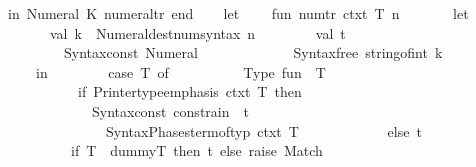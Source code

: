 \begin{isabellebody}
\ \ in\ {\isacharbrackleft}{\kern0pt}{\isacharparenleft}{\kern0pt}\isactrlsyntaxUNDERSCOREconst {\isasymopen}{\isacharunderscore}{\kern0pt}Numeral{\isasymclose}{\isacharcomma}{\kern0pt}\ K\ numeral{\isacharunderscore}{\kern0pt}tr{\isacharparenright}{\kern0pt}{\isacharbrackright}{\kern0pt}\ end\isanewline
{\isacartoucheclose}\isanewline
\isanewline
{}\isamarkupfalse%
\ {\isacartoucheopen}\isanewline
\ \ let\isanewline
\ \ \ \ fun\ num{\isacharunderscore}{\kern0pt}tr{\isacharprime}{\kern0pt}\ ctxt\ T\ {\isacharbrackleft}{\kern0pt}n{\isacharbrackright}{\kern0pt}\ {\isacharequal}{\kern0pt}\isanewline
\ \ \ \ \ \ let\isanewline
\ \ \ \ \ \ \ \ val\ k\ {\isacharequal}{\kern0pt}\ Numeral{\isachardot}{\kern0pt}dest{\isacharunderscore}{\kern0pt}num{\isacharunderscore}{\kern0pt}syntax\ n{\isacharsemicolon}{\kern0pt}\isanewline
\ \ \ \ \ \ \ \ val\ t{\isacharprime}{\kern0pt}\ {\isacharequal}{\kern0pt}\isanewline
\ \ \ \ \ \ \ \ \ \ Syntax{\isachardot}{\kern0pt}const\ \isactrlsyntaxUNDERSCOREconst {\isasymopen}{\isacharunderscore}{\kern0pt}Numeral{\isasymclose}\ {\isachardollar}{\kern0pt}\isanewline
\ \ \ \ \ \ \ \ \ \ \ \ Syntax{\isachardot}{\kern0pt}free\ {\isacharparenleft}{\kern0pt}string{\isacharunderscore}{\kern0pt}of{\isacharunderscore}{\kern0pt}int\ k{\isacharparenright}{\kern0pt}{\isacharsemicolon}{\kern0pt}\isanewline
\ \ \ \ \ \ in\isanewline
\ \ \ \ \ \ \ \ {\isacharparenleft}{\kern0pt}case\ T\ of\isanewline
\ \ \ \ \ \ \ \ \ \ Type\ {\isacharparenleft}{\kern0pt}\isactrltypeUNDERSCOREname {\isasymopen}fun{\isasymclose}{\isacharcomma}{\kern0pt}\ {\isacharbrackleft}{\kern0pt}{\isacharunderscore}{\kern0pt}{\isacharcomma}{\kern0pt}\ T{\isacharprime}{\kern0pt}{\isacharbrackright}{\kern0pt}{\isacharparenright}{\kern0pt}\ {\isacharequal}{\kern0pt}{\isachargreater}{\kern0pt}\isanewline
\ \ \ \ \ \ \ \ \ \ \ \ if\ Printer{\isachardot}{\kern0pt}type{\isacharunderscore}{\kern0pt}emphasis\ ctxt\ T{\isacharprime}{\kern0pt}\ then\isanewline
\ \ \ \ \ \ \ \ \ \ \ \ \ \ Syntax{\isachardot}{\kern0pt}const\ \isactrlsyntaxUNDERSCOREconst {\isasymopen}{\isacharunderscore}{\kern0pt}constrain{\isasymclose}\ {\isachardollar}{\kern0pt}\ t{\isacharprime}{\kern0pt}\ {\isachardollar}{\kern0pt}\isanewline
\ \ \ \ \ \ \ \ \ \ \ \ \ \ \ \ Syntax{\isacharunderscore}{\kern0pt}Phases{\isachardot}{\kern0pt}term{\isacharunderscore}{\kern0pt}of{\isacharunderscore}{\kern0pt}typ\ ctxt\ T{\isacharprime}{\kern0pt}\isanewline
\ \ \ \ \ \ \ \ \ \ \ \ else\ t{\isacharprime}{\kern0pt}\isanewline
\ \ \ \ \ \ \ \ {\isacharbar}{\kern0pt}\ {\isacharunderscore}{\kern0pt}\ {\isacharequal}{\kern0pt}{\isachargreater}{\kern0pt}\ if\ T\ {\isacharequal}{\kern0pt}\ dummyT\ then\ t{\isacharprime}{\kern0pt}\ else\ raise\ Match{\isacharparenright}{\kern0pt}\isanewline

\end{isabellebody}
